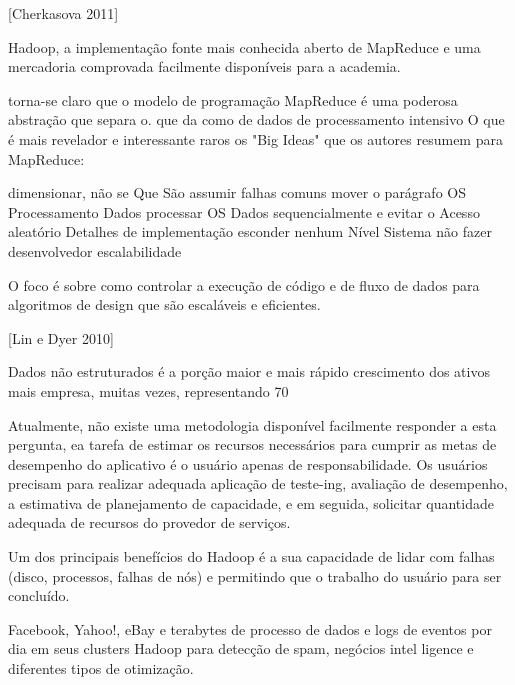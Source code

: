  
 [Cherkasova 2011]
 
 
 
 Hadoop, a implementação fonte mais conhecida aberto de MapReduce e uma mercadoria comprovada facilmente disponíveis para a academia.

torna-se claro que o modelo de programação MapReduce é uma poderosa abstração que separa o. que da como de dados de processamento intensivo O que é mais revelador e interessante raros os "Big Ideas" que os autores resumem para MapReduce:

dimensionar, não se
Que São assumir falhas comuns
mover o parágrafo OS Processamento Dados
processar OS Dados sequencialmente e evitar o Acesso aleatório
Detalhes de implementação esconder nenhum Nível Sistema não fazer desenvolvedor
escalabilidade


 O foco é sobre como controlar a execução de código e de fluxo de dados para algoritmos de design que são escaláveis ​​e eficientes.
 
 [Lin e Dyer 2010]
 
 
 Dados não estruturados é a porção maior e mais rápido crescimento dos ativos mais empresa, muitas vezes, representando 70%
 
 Atualmente, não existe uma metodologia disponível facilmente responder a esta pergunta, ea tarefa de estimar os recursos necessários para cumprir as metas de desempenho do aplicativo é o usuário apenas de responsabilidade. Os usuários precisam para realizar adequada aplicação de teste-ing, avaliação de desempenho, a estimativa de planejamento de capacidade, e em seguida, solicitar quantidade adequada de recursos do provedor de serviços.

 Um dos principais benefícios do Hadoop é a sua capacidade de lidar com falhas (disco, processos, falhas de nós) e permitindo que o trabalho do usuário para ser concluído.


Facebook, Yahoo!, eBay e terabytes de processo de dados e logs de eventos por dia em seus clusters Hadoop para detecção de spam, negócios intel ligence e diferentes tipos de otimização.

